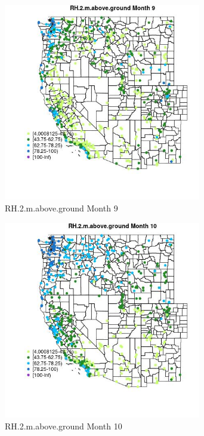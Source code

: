 \begin{figure} 
\centering  
\includegraphics[width=0.77\textwidth]{Code_Outputs/Report_ML_input_PM25_Step4_part_e_de_duplicated_aves_compiled_2019-05-14wNAs_MapObsMo9RH2maboveground.jpg} 
\caption{\label{fig:Report_ML_input_PM25_Step4_part_e_de_duplicated_aves_compiled_2019-05-14wNAsMapObsMo9RH2maboveground}RH.2.m.above.ground Month 9} 
\end{figure} 
 

\begin{figure} 
\centering  
\includegraphics[width=0.77\textwidth]{Code_Outputs/Report_ML_input_PM25_Step4_part_e_de_duplicated_aves_compiled_2019-05-14wNAs_MapObsMo10RH2maboveground.jpg} 
\caption{\label{fig:Report_ML_input_PM25_Step4_part_e_de_duplicated_aves_compiled_2019-05-14wNAsMapObsMo10RH2maboveground}RH.2.m.above.ground Month 10} 
\end{figure} 
 

